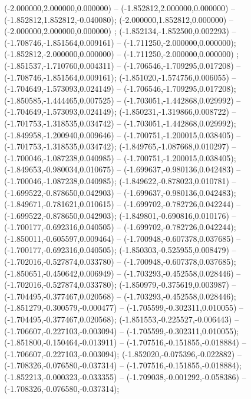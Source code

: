  (-2.000000,2.000000,0.000000) -- (-1.852812,2.000000,0.000000) -- (-1.852812,1.852812,-0.040080);
 (-2.000000,1.852812,0.000000) -- (-2.000000,2.000000,0.000000) ;
 (-1.852134,-1.852500,0.002293) -- (-1.708746,-1.851564,0.009161) -- (-1.711250,-2.000000,0.000000);
 (-1.852812,-2.000000,0.000000) -- (-1.711250,-2.000000,0.000000) ;
 (-1.851537,-1.710760,0.004311) -- (-1.706546,-1.709295,0.017208) -- (-1.708746,-1.851564,0.009161);
 (-1.851020,-1.574756,0.006055) -- (-1.704649,-1.573093,0.024149) -- (-1.706546,-1.709295,0.017208);
 (-1.850585,-1.444465,0.007525) -- (-1.703051,-1.442868,0.029992) -- (-1.704649,-1.573093,0.024149);
 (-1.850231,-1.319866,0.008722) -- (-1.701753,-1.318535,0.034742) -- (-1.703051,-1.442868,0.029992);
 (-1.849958,-1.200940,0.009646) -- (-1.700751,-1.200015,0.038405) -- (-1.701753,-1.318535,0.034742);
 (-1.849765,-1.087668,0.010297) -- (-1.700046,-1.087238,0.040985) -- (-1.700751,-1.200015,0.038405);
 (-1.849653,-0.980034,0.010675) -- (-1.699637,-0.980136,0.042483) -- (-1.700046,-1.087238,0.040985);
 (-1.849622,-0.878023,0.010781) -- (-1.699522,-0.878650,0.042903) -- (-1.699637,-0.980136,0.042483);
 (-1.849671,-0.781621,0.010615) -- (-1.699702,-0.782726,0.042244) -- (-1.699522,-0.878650,0.042903);
 (-1.849801,-0.690816,0.010176) -- (-1.700177,-0.692316,0.040505) -- (-1.699702,-0.782726,0.042244);
 (-1.850011,-0.605597,0.009464) -- (-1.700948,-0.607378,0.037685) -- (-1.700177,-0.692316,0.040505);
 (-1.850303,-0.525955,0.008479) -- (-1.702016,-0.527874,0.033780) -- (-1.700948,-0.607378,0.037685);
 (-1.850651,-0.450642,0.006949) -- (-1.703293,-0.452558,0.028446) -- (-1.702016,-0.527874,0.033780);
 (-1.850979,-0.375619,0.003987) -- (-1.704495,-0.377467,0.020568) -- (-1.703293,-0.452558,0.028446);
 (-1.851279,-0.300579,-0.000477) -- (-1.705599,-0.302311,0.010055) -- (-1.704495,-0.377467,0.020568);
 (-1.851553,-0.225527,-0.006443) -- (-1.706607,-0.227103,-0.003094) -- (-1.705599,-0.302311,0.010055);
 (-1.851800,-0.150464,-0.013911) -- (-1.707516,-0.151855,-0.018884) -- (-1.706607,-0.227103,-0.003094);
 (-1.852020,-0.075396,-0.022882) -- (-1.708326,-0.076580,-0.037314) -- (-1.707516,-0.151855,-0.018884);
 (-1.852213,-0.000323,-0.033355) -- (-1.709038,-0.001292,-0.058386) -- (-1.708326,-0.076580,-0.037314);
